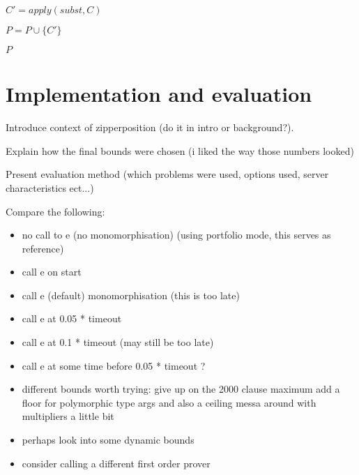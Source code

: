 \documentclass{article}
\begin{document}
\begin{algorithm}
\begin{algorithmic}[1]

      \State \(C' = apply(subst, C)\)


         \State \(P = P \cup \{C'\}\)
      \EndIf

   \EndFor
\EndFor

\State \Return \(P\)

\EndFunction
\end{algorithmic}
\end{algorithm}

\section{Implementation and evaluation}

Introduce context of zipperposition (do it in intro or background?).

Explain how the final bounds were chosen (i liked the way those numbers looked)

Present evaluation method (which problems were used, options used, server characteristics ect...)

Compare the following:
    \begin{itemize}
        \item no call to e (no monomorphisation) (using portfolio mode, this serves as reference)
        \item call e on start
        \item call e (default) monomorphisation (this is too late)
        \item call e at 0.05 * timeout
        \item call e at 0.1 * timeout (may still be too late)
        \item call e at some time before 0.05 * timeout ?
        \item different bounds worth trying: give up on the 2000 clause maximum
              add a floor for polymorphic type args and also a ceiling 
              messa around with multipliers a little bit
         \item perhaps look into some dynamic bounds
         \item consider calling a different first order prover
    \end{itemize}
\end{document}
